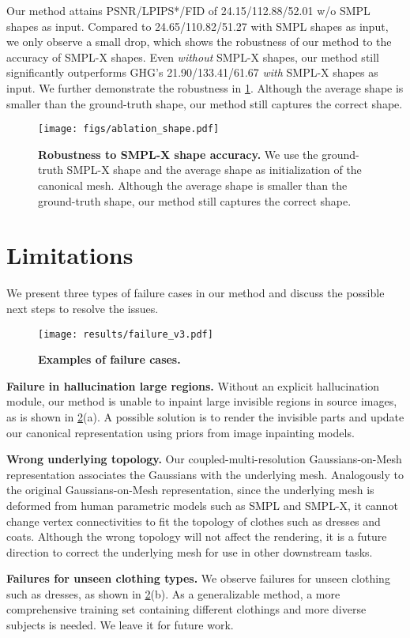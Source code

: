 Our method attains PSNR/LPIPS*/FID of 24.15/112.88/52.01 w/o SMPL shapes as input. Compared to 24.65/110.82/51.27 with SMPL shapes as input, we only observe a small drop, which shows the robustness of our method to the accuracy of SMPL-X shapes. Even \textit{without} SMPL-X shapes, our method still significantly outperforms GHG's 21.90/133.41/61.67 \textit{with} SMPL-X shapes as input. We further demonstrate the robustness in \cref{fig: shape_sensitivity}. Although the average shape is smaller than the ground-truth shape, our method still captures the correct shape.

\begin{figure}
    \centering
    \texttt{[image: figs/ablation\_shape.pdf]}
    \caption{\textbf{Robustness to SMPL-X shape accuracy.} We use the ground-truth SMPL-X shape and the average shape as initialization of the canonical mesh. Although the average shape is smaller than the ground-truth shape, our method still captures the correct shape.}
    \label{fig: shape_sensitivity}
\end{figure}

\section{Limitations}
\label{sec: appendix_limitation}
We present three types of failure cases in our method and discuss the possible next steps to resolve the issues.

\begin{figure}
    \centering
    \texttt{[image: results/failure\_v3.pdf]}
    \caption{\textbf{Examples of failure cases.}}
    \label{fig: limit}
\end{figure}

\textbf{Failure in hallucination large regions.} Without an explicit hallucination module, our method is unable to inpaint large invisible regions in source images, as is shown in \cref{fig: limit}(a). A possible solution is to render the invisible parts and update our canonical representation using priors from image inpainting models.

\textbf{Wrong underlying topology.} Our coupled-multi-resolution Gaussians-on-Mesh representation associates the Gaussians with the underlying mesh. Analogously to the original Gaussians-on-Mesh representation, since the underlying mesh is deformed from human parametric models such as SMPL and SMPL-X, it cannot change vertex connectivities to fit the topology of clothes such as dresses and coats. Although the wrong topology will not affect the rendering, it is a future direction to correct the underlying mesh for use in other downstream tasks.

\textbf{Failures for unseen clothing types.} We observe failures for unseen clothing such as dresses, as shown in \cref{fig: limit}(b). As a generalizable method, a more comprehensive training set containing different clothings and more diverse subjects is needed. We leave it for future work.


